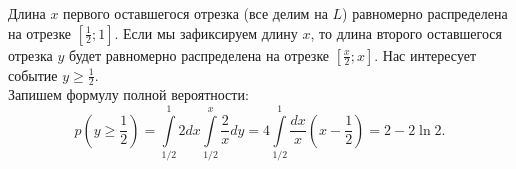 \documentclass{article}
\begin{document}
Длина $x$ первого оставшегося отрезка (все делим на $L$) равномерно распределена на отрезке $[\frac12;1]$. Если мы зафиксируем длину $x$, 
то длина второго оставшегося отрезка $y$ будет равномерно распределена на отрезке $[\frac{x}{2};x]$. Нас интересует событие $y \geqslant \frac12$.\\ 
Запишем формулу полной вероятности:
$$p(y \geqslant \frac12) = \int\limits_{1/2}^1 2dx \int\limits_{1/2}^x \frac2x dy = 4\int\limits_{1/2}^1 \frac{dx}{x} \left( x- \frac12 \right) = 2 - 2\ln 2.$$
\end{document}
